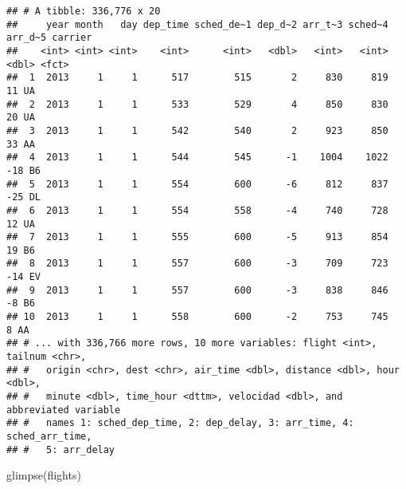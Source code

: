 \documentclass[
]{article}
\newenvironment{Shaded}{\begin{snugshade}}{\end{snugshade}}
\newcommand{\FunctionTok}[1]{\textcolor[rgb]{0.00,0.00,0.00}{#1}}
\newcommand{\NormalTok}[1]{#1}
\begin{document}
\begin{verbatim}
## # A tibble: 336,776 x 20
##     year month   day dep_time sched_de~1 dep_d~2 arr_t~3 sched~4 arr_d~5 carrier
##    <int> <int> <int>    <int>      <int>   <dbl>   <int>   <int>   <dbl> <fct>  
##  1  2013     1     1      517        515       2     830     819      11 UA     
##  2  2013     1     1      533        529       4     850     830      20 UA     
##  3  2013     1     1      542        540       2     923     850      33 AA     
##  4  2013     1     1      544        545      -1    1004    1022     -18 B6     
##  5  2013     1     1      554        600      -6     812     837     -25 DL     
##  6  2013     1     1      554        558      -4     740     728      12 UA     
##  7  2013     1     1      555        600      -5     913     854      19 B6     
##  8  2013     1     1      557        600      -3     709     723     -14 EV     
##  9  2013     1     1      557        600      -3     838     846      -8 B6     
## 10  2013     1     1      558        600      -2     753     745       8 AA     
## # ... with 336,766 more rows, 10 more variables: flight <int>, tailnum <chr>,
## #   origin <chr>, dest <chr>, air_time <dbl>, distance <dbl>, hour <dbl>,
## #   minute <dbl>, time_hour <dttm>, velocidad <dbl>, and abbreviated variable
## #   names 1: sched_dep_time, 2: dep_delay, 3: arr_time, 4: sched_arr_time,
## #   5: arr_delay
\end{verbatim}

\begin{Shaded}
\begin{Highlighting}[]
  \FunctionTok{glimpse}\NormalTok{(flights)}
\end{Highlighting}
\end{Shaded}
\end{document}
